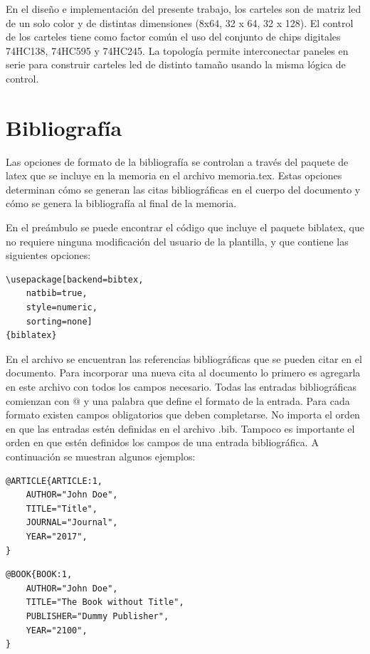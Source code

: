 En el diseño e implementación del presente trabajo, los carteles son de matriz led de un solo color y de distintas dimensiones (8x64, 32 x 64, 32 x 128). El control de los carteles tiene como factor común el uso del conjunto de chips digitales 74HC138, 74HC595 y 74HC245. La topología permite interconectar paneles en serie para construir carteles led de distinto tamaño usando la misma lógica de control. \\

\pagebreak
\section{Bibliografía}
\label{sec:biblio}

Las opciones de formato de la bibliografía se controlan a través del paquete de latex  que se incluye en la memoria en el archivo memoria.tex.  Estas opciones determinan cómo se generan las citas bibliográficas en el cuerpo del documento y cómo se genera la bibliografía al final de la memoria.

En el preámbulo se puede encontrar el código que incluye el paquete biblatex, que no requiere ninguna modificación del usuario de la plantilla, y que contiene las siguientes opciones:

\begin{lstlisting}
\usepackage[backend=bibtex,
	natbib=true, 
	style=numeric, 
	sorting=none]
{biblatex}
\end{lstlisting}

En el archivo  se encuentran las referencias bibliográficas que se pueden citar en el documento.  Para incorporar una nueva cita al documento lo primero es agregarla en este archivo con todos los campos necesario.  Todas las entradas bibliográficas comienzan con $@$ y una palabra que define el formato de la entrada.  Para cada formato existen campos obligatorios que deben completarse. No importa el orden en que las entradas estén definidas en el archivo .bib.  Tampoco es importante el orden en que estén definidos los campos de una entrada bibliográfica. A continuación se muestran algunos ejemplos:

\begin{lstlisting}
@ARTICLE{ARTICLE:1,
    AUTHOR="John Doe",
    TITLE="Title",
    JOURNAL="Journal",
    YEAR="2017",
}
\end{lstlisting}


\begin{lstlisting}
@BOOK{BOOK:1,
    AUTHOR="John Doe",
    TITLE="The Book without Title",
    PUBLISHER="Dummy Publisher",
    YEAR="2100",
}
\end{lstlisting}


